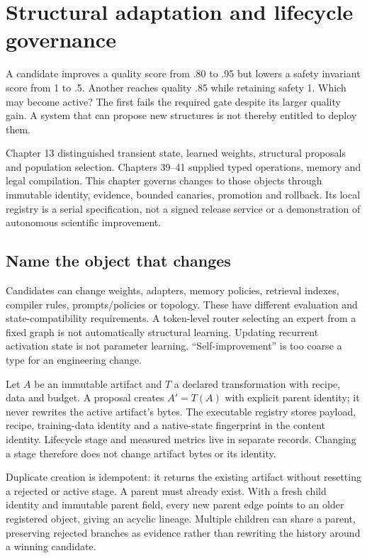 \chapter{Structural adaptation and lifecycle governance}
\label{evod43:chapter}

A candidate improves a quality score from .80 to .95 but lowers a safety
invariant score from 1 to .5. Another reaches quality .85 while retaining
safety 1. Which may become active? The first fails the required gate despite
its larger quality gain. A system that can propose new structures is not
thereby entitled to deploy them.

Chapter 13 distinguished transient state, learned weights, structural proposals
and population selection. Chapters 39--41 supplied typed operations, memory
and legal compilation. This chapter governs changes to those objects through
immutable identity, evidence, bounded canaries, promotion and rollback.
Its local registry is a serial specification, not a signed release service or
a demonstration of autonomous scientific improvement.

\section{Name the object that changes}
\label{evod43:objects}
Candidates can change weights, adapters, memory policies, retrieval indexes,
compiler rules, prompts/policies or topology. These have different evaluation
and state-compatibility requirements. A token-level router selecting an expert
from a fixed graph is not automatically structural learning. Updating recurrent
activation state is not parameter learning. ``Self-improvement'' is too coarse
a type for an engineering change.

Let $A$ be an immutable artifact and $T$ a declared transformation with recipe,
data and budget. A proposal creates $A'=T(A)$ with explicit parent identity;
it never rewrites the active artifact's bytes. The executable registry stores
payload, recipe, training-data identity and a native-state fingerprint in the
content identity. Lifecycle stage and measured metrics live in separate records.
Changing a stage therefore does not change artifact bytes or its identity.

Duplicate creation is idempotent: it returns the existing artifact without
resetting a rejected or active stage. A parent must already exist. With a
fresh child identity and immutable parent field, every new parent edge points
to an older registered object, giving an acyclic lineage. Multiple children
can share a parent, preserving rejected branches as evidence rather than
rewriting the history around a winning candidate.


